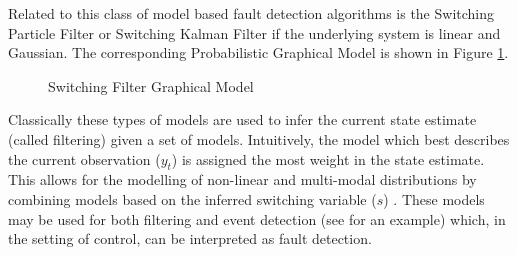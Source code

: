 Related to this class of model based fault detection algorithms is the Switching Particle Filter or Switching Kalman Filter if the underlying system is linear and Gaussian. The corresponding Probabilistic Graphical Model is shown in Figure \ref{fig_spf_skf}.
\begin{figure}[H] 
\centering
{}
\caption{Switching Filter Graphical Model}
\label{fig_spf_skf}
\end{figure}
Classically these types of models are used to infer the current state  estimate (called filtering) given a set of models. Intuitively, the model which best describes the current observation ($y_t$) is assigned the most weight in the state estimate. This allows for the modelling of non-linear and multi-modal distributions by combining models based on the inferred switching variable ($s$) \cite{murphy1}. These models may be used for both filtering and event detection (see \cite{veerar} for an example) which, in the setting of control, can be interpreted as fault detection.

